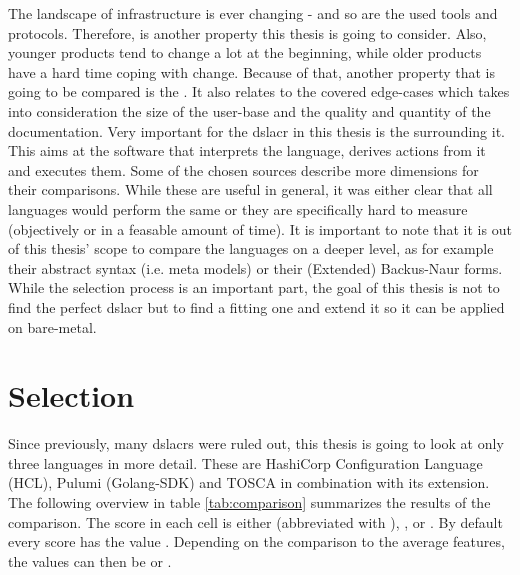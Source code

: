 The landscape of infrastructure is ever changing - and so are the used tools and protocols. Therefore,  is another property this thesis is going to consider.
\newline
Also, younger products tend to change a lot at the beginning, while older products have a hard time coping with change. Because of that, another property that is going to be compared is the . It also relates to the covered edge-cases which takes into consideration the size of the user-base and the quality and quantity of the documentation.
\newline
Very important for the \gls{dslacr} in this thesis is the  surrounding it. This aims at the software that interprets the language, derives actions from it and executes them.
\newline
Some of the chosen sources describe more dimensions for their comparisons. While these are useful in general, it was either clear that all languages would perform the same or they are specifically hard to measure (objectively or in a feasable amount of time). %
\newline
It is important to note that it is out of this thesis' scope to compare the languages on a deeper level, as for example their abstract syntax (i.e. meta models) or their (Extended) Backus-Naur forms. While the selection process is an important part, the goal of this thesis is not to find the perfect \gls{dslacr} but to find a fitting one and extend it so it can be applied on bare-metal.


\section{Selection}
Since previously, many \gls{dslacr}s were ruled out, this thesis is going to look at only three languages in more detail. These are HashiCorp Configuration Language (HCL), Pulumi (Golang-SDK) and TOSCA in combination with its  extension.
\newline
The following overview in table \ref{tab:comparison} summarizes the results of the comparison. The score in each cell is either  (abbreviated with ), , or . By default every score has the value . Depending on the comparison to the average features, the values can then be  or .

